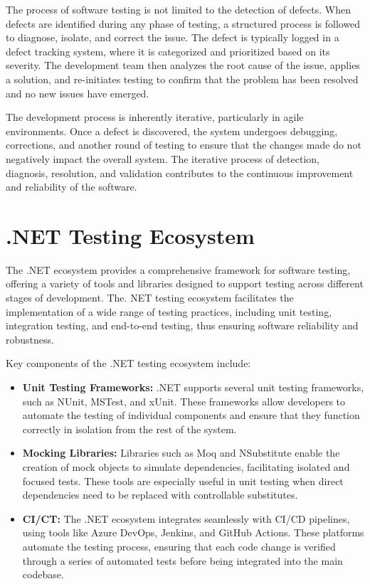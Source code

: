 The process of software testing is not limited to the detection of defects. When defects are identified during any phase of testing, a structured process is followed to diagnose, isolate, and correct the issue. The defect is typically logged in a defect tracking system, where it is categorized and prioritized based on its severity. The development team then analyzes the root cause of the issue, applies a solution, and re-initiates testing to confirm that the problem has been resolved and no new issues have emerged.

The development process is inherently iterative, particularly in agile environments. Once a defect is discovered, the system undergoes debugging, corrections, and another round of testing to ensure that the changes made do not negatively impact the overall system. The iterative process of detection, diagnosis, resolution, and validation contributes to the continuous improvement and reliability of the software.

\section{.NET Testing Ecosystem}

The .NET ecosystem provides a comprehensive framework for software testing, offering a variety of tools and libraries designed to support testing across different stages of development. The. NET testing ecosystem facilitates the implementation of a wide range of testing practices, including unit testing, integration testing, and end-to-end testing, thus ensuring software reliability and robustness.

Key components of the .NET testing ecosystem include:

\begin{itemize}
    \item \textbf{Unit Testing Frameworks:} .NET supports several unit testing frameworks, such as NUnit, MSTest, and xUnit. These frameworks allow developers to automate the testing of individual components and ensure that they function correctly in isolation from the rest of the system.
    \item \textbf{Mocking Libraries:} Libraries such as Moq and NSubstitute enable the creation of mock objects to simulate dependencies, facilitating isolated and focused tests. These tools are especially useful in unit testing when direct dependencies need to be replaced with controllable substitutes.
    \item \textbf{\acf{CI/CT}:} The .NET ecosystem integrates seamlessly with \ac{CI/CD} pipelines, using tools like Azure DevOps, Jenkins, and GitHub Actions. These platforms automate the testing process, ensuring that each code change is verified through a series of automated tests before being integrated into the main codebase.
\end{itemize}

